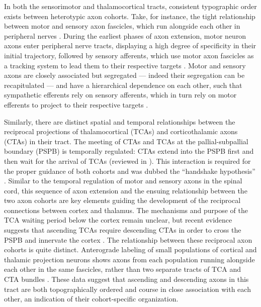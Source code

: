 In both the sensorimotor and thalamocortical tracts, consistent typographic order exists between heterotypic axon cohorts.
Take, for instance, the tight relationship between motor and sensory axon fascicles, which run alongside each other in peripheral nerves \cite{honig1998spatial}. 
During the earliest phases of axon extension, motor neuron axons enter peripheral nerve tracts, displaying a high degree of specificity in their initial trajectory, followed by sensory afferents, which use motor axon fascicles as a tracking system to lead them to their respective targets \cite{landmesser1986altered,huettl2011npn,wang2013axons,wang2014conserved}.
Motor and sensory axons are closely associated but segregated --- indeed their segregation can be recapitulated \invitro{} \cite{gallarda2008segregation} --- and have a hierarchical dependence on each other, such that sympathetic efferents rely on sensory afferents, which in turn rely on motor efferents to project to their respective targets \cite{wang2014conserved}.

Similarly, there are distinct spatial and temporal relationships between the reciprocal projections of thalamocortical (TCAs) and corticothalamic axons (CTAs) in their tract.
The meeting of CTAs and TCAs at the pallial-subpallial boundary (PSPB) is temporally regulated: CTAs extend into the PSPB first and then wait for the arrival of TCAs (reviewed in ). 
This interaction is required for the proper guidance of both cohorts and was dubbed the ``handshake hypothesis'' \cite{molnar1995thalamic}.
Similar to the temporal regulation of motor and sensory axons in the spinal cord, this sequence of axon extension and the ensuing relationship between the two axon cohorts are key elements guiding the development of the reciprocal connections between cortex and thalamus. 
The mechanisms and purpose of the TCA waiting period below the cortex remain unclear, but recent evidence suggests that ascending TCAs require descending CTAs in order to cross the PSPB and innervate the cortex \cite{chen2012evidence}.
The relationship between these reciprocal axon cohorts is quite distinct.
Anterograde labeling of small populations of cortical and thalamic projection neurons shows axons from each population running alongside each other in the same fascicles, rather than two separate tracts of TCA and CTA bundles \cite{molnar1998mechanisms}. 
These data suggest that ascending and descending axons in this tract are both topographically ordered and course in close association with each other, an indication of their cohort-specific organization. 
